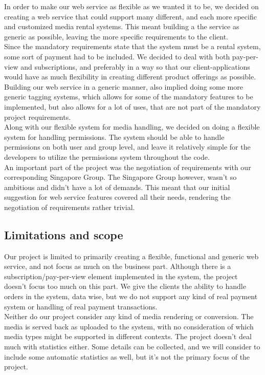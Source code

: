 \documentclass[10pt,a4paper]{article}
\begin{document}
In order to make our web service as flexible as we wanted it to be, we decided on creating a web service that could support many different, and each more specific and customized media rental systems. This meant building a the service as generic as possible, leaving the more specific requirements to the client. \\

Since the mandatory requirements state that the system must be a rental system, some sort of payment had to be included. We decided to deal with both pay-per-view and subscriptions, and preferably in a way so that our client-applications would have as much flexibility in creating different product offerings as possible. Building our web service in a generic manner, also implied doing some more generic tagging systems, which allows for some of the mandatory features to be implemented, but also allows for a lot of uses, that are not part of the mandatory project requirements. \\

Along with our flexible system for media handling, we decided on doing a flexible system for handling permissions. The system should be able to handle permissions on both user and group level, and leave it relatively simple for the developers to utilize the permissions system throughout the code. \\

An important part of the project was the negotiation of requirements with our corresponding Singapore Group. The Singapore Group however, wasn’t so ambitious and didn't have a lot of demands. This meant that our initial suggestion for web service features covered all their needs, rendering the negotiation of requirements rather trivial.

\subsection{Limitations and scope}
Our project is limited to primarily creating a flexible, functional and generic web service, and not focus as much on the business part. Although there is a subscription/pay-per-view element implemented in the system, the project doesn't focus too much on this part. We give the clients the ability to handle orders in the system, data wise, but we do not support any kind of real payment system or handling of real payment transactions. \\

Neither do our project consider any kind of media rendering or conversion. The media is served back as uploaded to the system, with no consideration of which media types might be supported in different contexts. The project doesn't deal much with statistics either. Some details can be collected, and we will consider to include some automatic statistics as well, but it's not the primary focus of the project. \\
\end{document}
